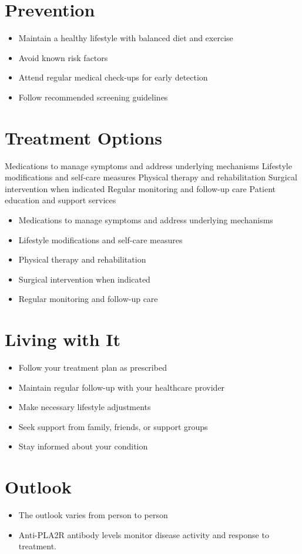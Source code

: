 \section{Prevention}
\begin{itemize}[noitemsep]
  \item Maintain a healthy lifestyle with balanced diet and exercise
  \item Avoid known risk factors
  \item Attend regular medical check-ups for early detection
  \item Follow recommended screening guidelines
\end{itemize}
\section{Treatment Options}
Medications to manage symptoms and address underlying mechanisms Lifestyle modifications and self-care measures Physical therapy and rehabilitation Surgical intervention when indicated Regular monitoring and follow-up care Patient education and support services

\begin{itemize}[noitemsep]
  \item Medications to manage symptoms and address underlying mechanisms
  \item Lifestyle modifications and self-care measures
  \item Physical therapy and rehabilitation
  \item Surgical intervention when indicated
  \item Regular monitoring and follow-up care
\end{itemize}
\section{Living with It}
\begin{itemize}[noitemsep]
  \item Follow your treatment plan as prescribed
  \item Maintain regular follow-up with your healthcare provider
  \item Make necessary lifestyle adjustments
  \item Seek support from family, friends, or support groups
  \item Stay informed about your condition
\end{itemize}
\section{Outlook}
\begin{itemize}[noitemsep]
  \item The outlook varies from person to person
  \item Anti-PLA2R antibody levels monitor disease activity and response to treatment.
\end{itemize}
